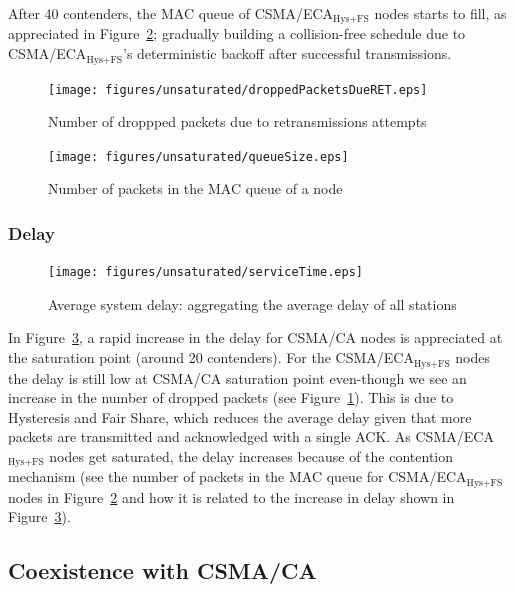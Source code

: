 \documentclass[a4paper,journal]{IEEEtran}
\begin{document}
	After 40 contenders, the MAC queue of CSMA/ECA$_{\text{Hys+FS}}$ nodes starts to fill, as appreciated in Figure~\ref{fig:MacQ}; gradually building a collision-free schedule due to CSMA/ECA$_{\text{Hys+FS}}$'s deterministic backoff after successful transmissions.
	
   	\begin{figure}[htbp]
		\centering
		\texttt{[image: figures/unsaturated/droppedPacketsDueRET.eps]}
		\caption{Number of droppped packets due to retransmissions attempts}
		\label{fig:droppedDueToRET}
	\end{figure}
	
	 \begin{figure}[htbp]
		\centering
		\texttt{[image: figures/unsaturated/queueSize.eps]}
		\caption{Number of packets in the MAC queue of a node}
		\label{fig:MacQ}
	\end{figure}
	
	\subsubsection{Delay}
	
	\begin{figure}[htbp]
		\centering
		\texttt{[image: figures/unsaturated/serviceTime.eps]}
		\caption{Average system delay: aggregating the average delay of all stations}
		\label{fig:serviceTime-unsat}
	\end{figure}
	
	In Figure~\ref{fig:serviceTime-unsat}, a rapid increase in the delay for CSMA/CA nodes is appreciated at the saturation point (around 20 contenders). For the CSMA/ECA$_{\text{Hys+FS}}$ nodes the delay is still low at CSMA/CA saturation point even-though we see an increase in the number of dropped packets (see Figure~\ref{fig:droppedDueToRET}). This is due to Hysteresis and Fair Share, which reduces the average delay given that more packets are transmitted and acknowledged with a single ACK. As CSMA/ECA$_{\text{Hys+FS}}$ nodes get saturated, the delay increases because of the contention mechanism (see the number of packets in the MAC queue for CSMA/ECA$_{\text{Hys+FS}}$ nodes in Figure~\ref{fig:MacQ} and how it is related to the increase in delay shown in Figure~\ref{fig:serviceTime-unsat}).\\	

	\subsection{Coexistence with CSMA/CA}
	
\end{document}
